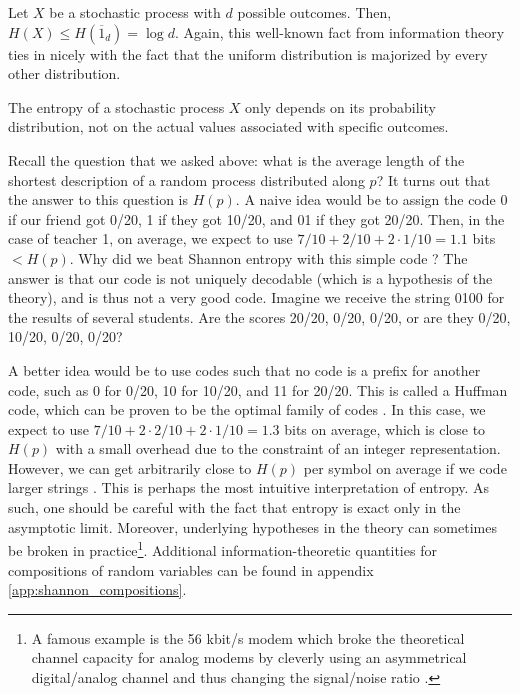 \begin{remark}
    Let $X$ be a stochastic process with $d$ possible outcomes. Then, $H(X) \leq H\left(\overline{1}_d\right) = \log d$. Again, this well-known fact from information theory ties in nicely with the fact that the uniform distribution is majorized by every other distribution.
\end{remark}

\begin{remark}
    The entropy of a stochastic process $X$ only depends on its probability distribution, not on the actual values associated with specific outcomes.
\end{remark}

Recall the question that we asked above: what is the average length of the shortest description of a random process distributed along $p$? It turns out that the answer to this question is $H(p)$. A naive idea would be to assign the code 0 if our friend got 0/20, 1 if they got 10/20, and 01 if they got 20/20. Then, in the case of teacher 1, on average, we expect to use $7/10 + 2/10 + 2 \cdot 1/10 = 1.1$ bits $< H(p)$. Why did we beat Shannon entropy with this simple code ? The answer is that our code is not uniquely decodable (which is a hypothesis of the theory), and is thus not a very good code. Imagine we receive the string 0100 for the results of several students. Are the scores 20/20, 0/20, 0/20, or are they 0/20, 10/20, 0/20, 0/20?

A better idea would be to use codes such that no code is a prefix for another code, such as 0 for 0/20, 10 for 10/20, and 11 for 20/20. This is called a Huffman code, which can be proven to be the optimal family of codes \cite[p. 123]{cover_elements_2006}. In this case, we expect to use $7/10 + 2 \cdot 2/10 + 2 \cdot 1/10 = 1.3$ bits on average, which is close to $H(p)$ with a small overhead due to the constraint of an integer representation. However, we can get arbitrarily close to $H(p)$ per symbol on average if we code larger strings \cite[p. 114]{cover_elements_2006}. This is perhaps the most intuitive interpretation of entropy. As such, one should be careful with the fact that entropy is exact only in the asymptotic limit. Moreover, underlying hypotheses in the theory can sometimes be broken in practice\footnote{A famous example is the 56 kbit/s modem which broke the theoretical channel capacity for analog modems by cleverly using an asymmetrical digital/analog channel and thus changing the signal/noise ratio \cite{cover_elements_2006}.}. Additional information-theoretic quantities for compositions of random variables can be found in appendix \ref{app:shannon_compositions}. %

